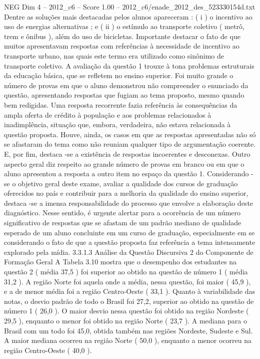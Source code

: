 \begin{textsample}{NEG Dim 4 – 2012\_c6 – Score 1.00 – 2012\_c6/enade\_2012\_des\_523330154d.txt}
Dentre as soluções mais destacadas pelos alunos apareceram : ( i ) o incentivo ao uso de energias alternativas ; e ( ii ) o estímulo ao transporte coletivo ( metrô, trem e ônibus ), além do uso de bicicletas.
Importante destacar o fato de que muitos apresentavam respostas com referências à necessidade de incentivo ao transporte urbano, nas quais este termo era utilizado como sinônimo de transporte coletivo.
A avaliação da questão 1 trouxe à tona problemas estruturais da educação básica, que se refletem no ensino superior.
Foi muito grande o número de provas em que o aluno demonstrou não compreender o enunciado da questão, apresentando respostas que fugiam ao tema proposto, mesmo quando bem redigidas.
Uma resposta recorrente fazia referência às consequências da ampla oferta de crédito à população e aos problemas relacionados à inadimplência, situação que, embora, verdadeira, não estava relacionada à questão proposta.
Houve, ainda, os casos em que as respostas apresentadas não só se afastaram do tema como não reuniam qualquer tipo de argumentação coerente.
E, por fim, destaca -se a existência de respostas incoerentes e desconexas.
Outro aspecto geral diz respeito ao grande número de provas em branco ou em que o aluno apresentou a resposta a outro item no espaço da questão 1.
Considerando -se o objetivo geral deste exame, avaliar a qualidade dos cursos de graduação oferecidos no país e contribuir para a melhoria da qualidade do ensino superior, destaca -se a imensa responsabilidade do processo que envolve a elaboração deste diagnóstico.
Nesse sentido, é urgente alertar para a ocorrência de um número significativo de respostas que se afastam de um padrão mediano de qualidade esperado de um aluno concluinte em um curso de graduação, especialmente em se considerando o fato de que a questão proposta faz referência a tema intensamente explorado pela mídia. 3.3.1.3 Análise da Questão Discursiva 2 do Componente de Formação Geral A Tabela 3.10 mostra que o desempenho dos estudantes na questão 2 ( média 37,5 ) foi superior ao obtido na questão de número 1 ( média 31,2 ).
A região Norte foi aquela onde a média, nessa questão, foi maior ( 45,9 ), e a de menor média foi a região Centro-Oeste ( 33,1 ).
Quanto à variabilidade das notas, o desvio padrão de todo o Brasil foi 27,2, superior ao obtido na questão de número 1 ( 26,0 ).
O maior desvio nessa questão foi obtido na região Nordeste ( 29,5 ), enquanto o menor foi obtido na região Norte ( 23,7 ).
A mediana para o Brasil com um todo foi 45,0, obtida também nas regiões Nordeste, Sudeste e Sul.
A maior mediana ocorreu na região Norte ( 50,0 ), enquanto a menor ocorreu na região Centro-Oeste ( 40,0 ).

\end{textsample}
